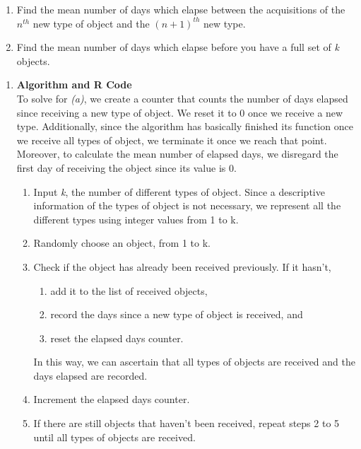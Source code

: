 \documentclass[12pt,letterpaper]{article}
\begin{document}
    \begin{enumerate}[label=(\alph*)]
        \item Find the mean number of days which elapse between the acquisitions of the $n^{th}$ new type of object and the $(n+1)^{th}$ new type.
        \item Find the mean number of days which elapse before you have a full set of \textit{k} objects.
    \end{enumerate}
    \vspace*{0.5cm}
    \begin{enumerate}[label=\Alph*]
        \item \textbf{Algorithm and R Code}\\
        To solve for \textit{(a)}, we create a counter that counts the number of days elapsed since receiving a new type of object. We reset it to 0 once we receive a new type. Additionally, since the algorithm has basically finished its function once we receive all types of object, we terminate it once we reach that point. Moreover, to calculate the mean number of elapsed days, we disregard the first day of receiving the object since its value is 0. 
        \begin{enumerate}[label=\arabic*.]
            \item Input \textit{k}, the number of different types of object. Since a descriptive information of the types of object is not necessary, we represent all the different types using integer values from 1 to k.
            \item Randomly choose an object, from 1 to k.
            \item Check if the object has already been received previously. If it hasn't, 
            \begin{enumerate}[label=3.\arabic*]
                \item add it to the list of received objects, 
                \item record the days since a new type of object is received, and
                \item reset the elapsed days counter. 
            \end{enumerate}
                In this way, we can ascertain that all types of objects are received and the days elapsed are recorded. 
            \item Increment the elapsed days counter.
            \item If there are still objects that haven't been received, repeat steps 2 to 5 until all types of objects are received. 

\end{enumerate}
\end{enumerate}
\end{document}
